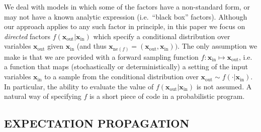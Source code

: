 \documentclass[english]{article}
\theoremstyle{plain}
\theoremstyle{plain}
\newcommand{\bx}{\mathbf{x}}				%
\newcommand{\factor}{f}				%
\newcommand{\fis}[1]{\mathrm{ne}(#1)}   	%
\newcommand{\fx}[1]{ \mathbf{x}_{\mathrm{ne}(#1)} }   	%
\newcommand{\xin}{\mathbf{x}_{ \mathrm{in} }} 			%
\newcommand{\xout}{\mathbf{x}_{ \mathrm{out} }}			%
\newcommand{\msg}[2]{m_{#1 \rightarrow #2}}			%
\newcommand{\diffd}{\mathrm{d}}
\begin{document}
We deal with models in which some of the factors have a non-standard form, or may not have a known analytic expression (i.e.\ ``black box'' factors). Although our approach applies to any such factor in principle, in this paper we focus on \textit{directed} factors $\factor(\xout | \xin)$ which specify a conditional distribution over variables $\xout$ given $\xin$ (and thus $\fx{\factor} = (\xout, \xin))$. The only assumption we make is that we are provided with a forward sampling function $f: \xin \mapsto \xout$, i.e. a function that maps (stochastically or deterministically) a setting of the input variables $\xin$ to a sample from the conditional distribution over $\xout \sim \factor(\cdot| \xin)$.
In particular, the ability to evaluate the value of $\factor(\xout | \xin)$ is not assumed.
A natural way of specifying $f$ is a short piece of code in a probabilistic program.



\subsection{EXPECTATION PROPAGATION}
\label{sec:EP:MP}

\end{document}
